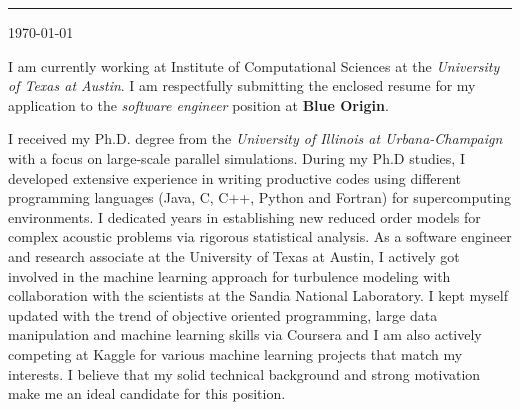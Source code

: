 \documentclass[11pt]{article}
\newcommand{\company}{\textbf{Blue Origin}}
\newcommand{\position}{\textit{software engineer }}
\begin{document}
\thispagestyle{empty}
%
%
\begin{minipage}[t]{0.45\textwidth}
\vspace{-0.5truein}
\end{minipage} 



%
%
\vspace{0.2truein}
\rule[0.8em]{\textwidth}{1.0pt} 

\noindent
\begin{minipage}[b]{0.7\textwidth}
\vspace{-0.35truein}
\noindent
\small
\begin{tabbing}
\end{tabbing}
\vspace{0pt}
\end{minipage} \hfill
\begin{minipage}[b]{0.7\textwidth}
\vspace{0pt}
\noindent
\begin{tabbing}
\today 
\end{tabbing}
\vspace{0pt}
\end{minipage} 
%
%




I am currently working at Institute of Computational Sciences at the \emph{University of Texas at Austin}.   I am respectfully submitting the enclosed resume for my application to the \position position at \company.  

I received my Ph.D. degree from the \emph{University of Illinois at Urbana-Champaign} with a focus on large-scale parallel simulations.   During my Ph.D studies, I developed extensive experience in writing productive codes using different programming languages (Java, C, C++, Python and Fortran) for supercomputing environments.   I dedicated years in establishing new reduced order models for complex acoustic problems via rigorous statistical analysis.   As a software engineer and research associate at the University of Texas at Austin, I actively got involved in the machine learning approach for turbulence modeling with collaboration with the scientists at the Sandia National Laboratory.     I kept myself updated with the trend of objective oriented programming, large data manipulation and machine learning skills via Coursera and I am also actively competing at Kaggle for various machine learning projects that match my interests.    I believe that my solid technical background and strong motivation make me an ideal candidate for this position. 
\end{document}

